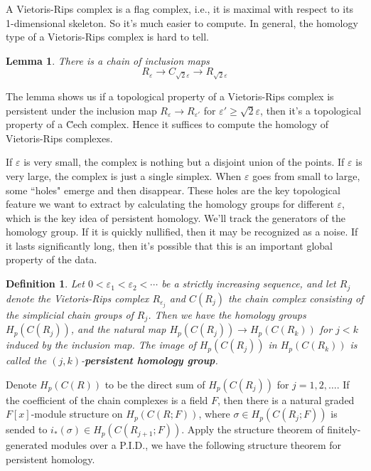 \documentclass{assignment}[2019/10/15]
\theoremstyle{plain}
\newtheorem{definition}[theorem]{Definition}
\newtheorem{lemma}[theorem]{Lemma}
\renewcommand{\emph}[1]{\textbf{#1}}
\newcommand{\CECH}{\u{C}ech}
\begin{document}
  A Vietoris-Rips complex is a flag complex, i.e., it is maximal with respect to its 1-dimensional skeleton. So it's much easier to compute. In general, the homology type of a Vietoris-Rips complex is hard to tell.

  \begin{lemma}
    There is a chain of inclusion maps
    \begin{equation}
      R_\varepsilon\to C_{\sqrt{2}\varepsilon}\to R_{\sqrt{2}\varepsilon}
    \end{equation}
  \end{lemma}

  The lemma shows us if a topological property of a Vietoris-Rips complex is persistent under the inclusion map $R_\varepsilon\to R_{\varepsilon'}$ for $\varepsilon'\geq \sqrt{2}\varepsilon$, then it's a topological property of a {\CECH} complex. Hence it suffices to compute the homology of Vietoris-Rips complexes.

  If $\varepsilon$ is very small, the complex is nothing but a disjoint union of the points. If $\varepsilon$ is very large, the complex is just a single simplex. When $\varepsilon$ goes from small to large, some ``holes" emerge and then disappear. These holes are the key topological feature we want to extract by calculating the homology groups for different $\varepsilon$, which is the key idea of persistent homology. We'll track the generators of the homology group. If it is quickly nullified, then it may be recognized as a noise. If it lasts significantly long, then it's possible that this is an important global property of the data.

  \begin{definition}
    Let $0<\varepsilon_1<\varepsilon_2<\dotsb$ be a strictly increasing sequence, and let $R_j$ denote the Vietoris-Rips complex $R_{\varepsilon_j}$ and $C(R_j)$ the chain complex consisting of the simplicial chain groups of $R_j$. Then we have the homology groups $H_p(C(R_j))$, and the natural map $H_p(C(R_j))\to H_p(C(R_k))$ for $j<k$ induced by the inclusion map. The image of $H_p(C(R_j))$ in $H_p(C(R_k))$ is called the $(j, k)$-\emph{persistent homology group}.
  \end{definition}

  Denote $H_p(C(R))$ to be the direct sum of $H_p(C(R_j))$ for $j=1, 2, \dotsc$. If the coefficient of the chain complexes is a field $F$, then there is a natural graded $F[x]$-module structure on $H_p(C(R; F))$, where $\sigma\in H_p(C(R_j; F))$ is sended to $i_*(\sigma)\in H_p(C(R_{j+1}; F))$. Apply the structure theorem of finitely-generated modules over a P.I.D., we have the following structure theorem for persistent homology.
\end{document}
